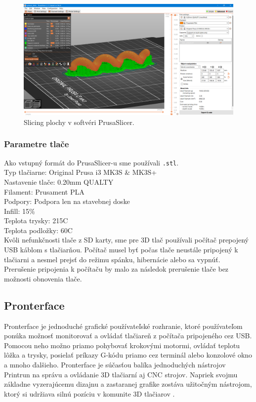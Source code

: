 \begin{figure}[h]
	\centering
	\includegraphics[width=\textwidth]{images/prusaslicer.png}
	\caption[Softvér PrusaSlicer.]{Slicing plochy v softvéri PrusaSlicer.}
	\label{fig:prusaslicer}
\end{figure}

\subsubsection{Parametre tlače}
Ako vstupný formát do PrusaSlicer-u sme používali \verb|.stl|. \\
Typ tlačiarne: Original Prusa i3 MK3S \& MK3S+ \\
Nastavenie tlače: 0.20mm QUALTY \\
Filament: Prusament PLA \\
Podpory: Podpora len na stavebnej doske \\
Infill: 15\% \\
Teplota trysky: 215\textdegree{}C \\
Teplota podložky: 60\textdegree{}C \\
Kvôli nefunkčnosti tlače z SD karty, sme pre 3D tlač používali počítač prepojený USB káblom s tlačiarňou. Počítač musel byť počas tlače neustále pripojený k tlačiarni a nesmel prejsť do režimu spánku, hibernácie alebo sa vypnúť. Prerušenie pripojenia k počítaču by malo za následok prerušenie tlače bez možnosti obnovenia tlače. 

\subsection{Pronterface}
Pronterface je jednoduché grafické používateľské rozhranie, ktoré používateľom ponúka možnosť monitorovať a ovládať tlačiareň z počítača pripojeného cez USB. Pomocou neho možno priamo pohybovať krokovými motormi, ovládať teplotu lôžka a trysky, posielať príkazy G-kódu priamo cez terminál alebo konzolové okno a mnoho ďalšieho. Pronterface je súčasťou balíka jednoduchých nástrojov Printrun na správu a ovládanie 3D tlačiarní aj CNC strojov. Napriek svojmu základne vyzerajúcemu dizajnu a zastaranej grafike zostáva užitočným nástrojom, ktorý si udržiava silnú pozíciu v komunite 3D tlačiarov \cite{Prontersetup}. 

